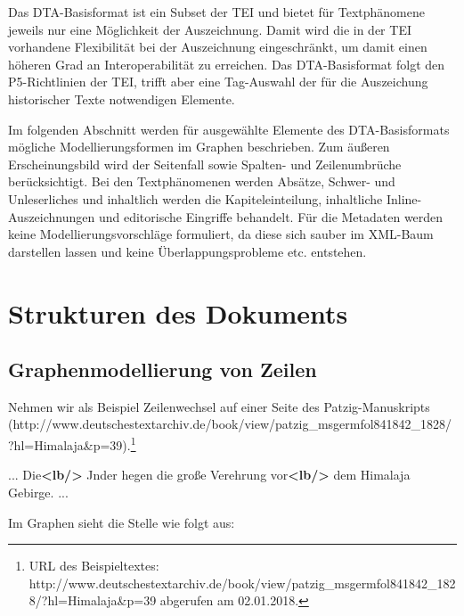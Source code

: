 \documentclass[ngerman,]{scrreprt}
\newenvironment{Shaded}{}{}
\newcommand{\KeywordTok}[1]{\textcolor[rgb]{0.00,0.44,0.13}{\textbf{#1}}}
\newcommand{\NormalTok}[1]{#1}
\begin{document}
Das DTA-Basisformat ist ein Subset der TEI und bietet für Textphänomene jeweils nur eine Möglichkeit der Auszeichnung. Damit wird die in der TEI vorhandene Flexibilität bei der Auszeichnung eingeschränkt, um damit einen höheren Grad an Interoperabilität zu erreichen. Das DTA-Basisformat folgt den P5-Richtlinien der TEI, trifft aber eine Tag-Auswahl der für die Auszeichung historischer Texte notwendigen Elemente.

Im folgenden Abschnitt werden für ausgewählte Elemente des DTA-Basisformats mögliche Modellierungsformen im Graphen beschrieben. Zum äußeren Erscheinungsbild wird der Seitenfall sowie Spalten- und Zeilenumbrüche berücksichtigt. Bei den Textphänomenen werden Absätze, Schwer- und Unleserliches und inhaltlich werden die Kapiteleinteilung, inhaltliche Inline-Auszeichnungen und editorische Eingriffe behandelt. Für die Metadaten werden keine Modellierungsvorschläge formuliert, da diese sich sauber im XML-Baum darstellen lassen und keine Überlappungsprobleme etc. entstehen.

\section{Strukturen des Dokuments}\label{strukturen-des-dokuments}

\subsection{Graphenmodellierung von Zeilen}\label{graphenmodellierung-von-zeilen}

Nehmen wir als Beispiel Zeilenwechsel auf einer Seite des Patzig-Manuskripts (http://www.deutschestextarchiv.de/book/view/patzig\_msgermfol841842\_1828/?hl=Himalaja\&p=39).\footnote{URL des Beispieltextes: http://www.deutschestextarchiv.de/book/view/patzig\_msgermfol841842\_1828/?hl=Himalaja\&p=39 abgerufen am 02.01.2018.}

\begin{Shaded}
\begin{Highlighting}[]
\NormalTok{... Die}\KeywordTok{<lb/>}
\NormalTok{Jnder hegen die große Verehrung vor}\KeywordTok{<lb/>}
\NormalTok{dem Himalaja Gebirge. ...}
\end{Highlighting}
\end{Shaded}

Im Graphen sieht die Stelle wie folgt aus:
\end{document}
